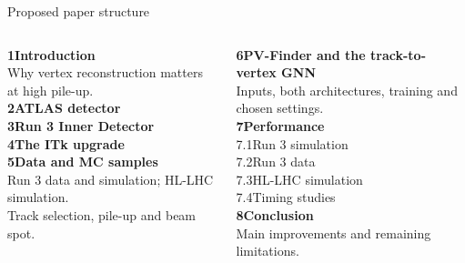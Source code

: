 \begin{frame}{Proposed paper structure}
\begin{columns}[T]
\begin{column}{.45\linewidth}
\small
\textbf{1\quad Introduction}\\[.45em]
Why vertex reconstruction matters at high pile-up.\\[1em]
\textbf{2\quad ATLAS detector}\\[.6em]
\textbf{3\quad Run 3 Inner Detector}\\[.6em]
\textbf{4\quad The ITk upgrade}\\[1em]
\textbf{5\quad Data and MC samples}\\[.45em]
Run 3 data and simulation; HL-LHC simulation.\\[.35em]
Track selection, pile-up and beam spot.
\end{column}
\begin{column}{.51\linewidth}
\small
\textbf{6\quad PV-Finder and the track-to-vertex GNN}\\[.45em]
Inputs, both architectures, training and chosen settings.\\[1em]
\textbf{7\quad Performance}\\[.45em]
7.1\quad Run 3 simulation\\[.3em]
7.2\quad Run 3 data\\[.3em]
7.3\quad HL-LHC simulation\\[.3em]
7.4\quad Timing studies\\[1em]
\textbf{8\quad Conclusion}\\[.45em]
Main improvements and remaining limitations.
\end{column}
\end{columns}
\end{frame}


